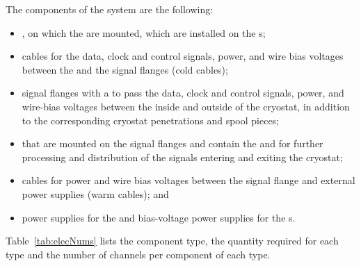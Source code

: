 The components of the  system are the following:
\begin{itemize}
\item{, on which the  are mounted, which are installed on the s;}
\item{cables for the data, clock and control signals,  power, and wire bias voltages between the  and the signal flanges (cold cables);}
\item{signal flanges with a  \fdth to pass the data, clock and control signals,  power, and  wire-bias voltages between the inside and outside of the cryostat, in addition to the corresponding cryostat penetrations and spool pieces;}
\item{%
 that are mounted on the signal flanges and contain
the %
 and %
 for further processing
and distribution of the signals entering and exiting the cryostat;}
\item{cables for  power and wire bias voltages between the signal flange and external power
supplies (warm cables); and}
\item{ power supplies for the  and bias-voltage power supplies for the s.}
\end{itemize}

Table~\ref{tab:elecNums} lists the component type, the quantity required for each type  and the number of channels per component of each type.

